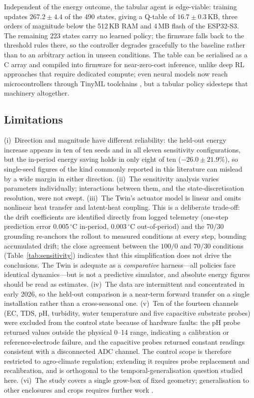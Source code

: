 \documentclass[conference]{IEEEtran}
\begin{document}
Independent of the energy outcome, the tabular agent is edge-viable: training
updates $267.2\pm4.4$ of the 490 states, giving a Q-table of $16.7\pm0.3$\,KB,
three orders of magnitude below the 512\,KB RAM and 4\,MB flash of the ESP32-S3.
The remaining 223 states carry no learned policy; the firmware falls back to the
threshold rules there, so the controller degrades gracefully to the baseline
rather than to an arbitrary action in unseen conditions. The table can be
serialised as a C array and compiled into firmware for near-zero-cost inference,
unlike deep RL approaches \cite{ajagekar2022,bua2025} that require dedicated
compute; even neural models now reach microcontrollers through TinyML toolchains
\cite{ray2022}, but a tabular policy sidesteps that machinery altogether.

\subsection{Limitations}
\label{sec:limitations}
(i)~Direction and magnitude have different reliability: the held-out energy
increase appears in ten of ten seeds and in all eleven sensitivity
configurations, but the in-period energy saving holds in only eight of ten
($-26.0\pm21.9\%$), so single-seed figures of the kind commonly reported in this
literature can mislead by a wide margin in either direction. (ii)~The sensitivity
analysis varies parameters individually; interactions between them, and the
state-discretisation resolution, were not swept. (iii)~The Twin's actuator model
is linear and omits nonlinear heat transfer and latent-heat coupling. This is a
deliberate trade-off: the drift coefficients are identified directly from logged
telemetry (one-step prediction error 0.005\,$^{\circ}$C in-period,
0.003\,$^{\circ}$C out-of-period) and the 70/30 grounding re-anchors the rollout
to measured conditions at every step, bounding accumulated drift; the close
agreement between the $100/0$ and $70/30$ conditions
(Table~\ref{tab:sensitivity}) indicates that this simplification does not drive
the conclusions. The Twin is adequate as a \emph{comparative} harness---all
policies face identical dynamics---but is not a predictive simulator, and
absolute energy figures should be read as estimates. (iv)~The data are
intermittent and concentrated in early 2026, so the held-out comparison is a
near-term forward transfer on a single installation rather than a cross-seasonal
one. (v)~Ten of the fourteen channels (EC, TDS, pH, turbidity, water temperature
and five capacitive substrate probes) were excluded from the control state
because of hardware faults: the pH probe returned values outside the physical
0--14 range, indicating a calibration or reference-electrode failure, and the
capacitive probes returned constant readings consistent with a disconnected ADC
channel. The control scope is therefore restricted to agro-climate regulation;
extending it requires probe replacement and recalibration, and is orthogonal to
the temporal-generalisation question studied here. (vi)~The study covers a single
grow-box of fixed geometry; generalisation to other enclosures and crops requires
further work \cite{chen2025}.
\end{document}
